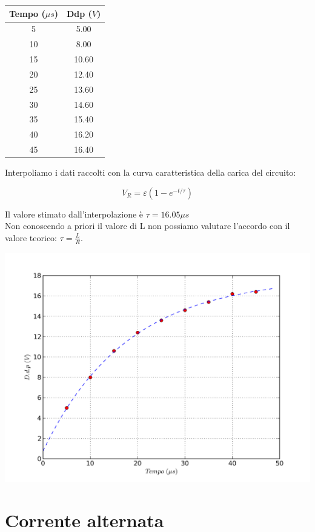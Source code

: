 \begin{center}
\begin{tabular}{*{2}{c}}
Tempo ($\mu s$) & Ddp ($V$) \\
\midrule
5 & 5.00 \\
10 & 8.00 \\
15 & 10.60 \\
20 & 12.40 \\
25 & 13.60 \\
30 & 14.60 \\
35 & 15.40 \\
40 & 16.20 \\
45 & 16.40 \\
\end{tabular}
\end{center}
Interpoliamo i dati raccolti con la curva caratteristica della carica del circuito:

$$V_R = \varepsilon \left( 1-e^{-t/\tau} \right)$$

Il valore stimato dall'interpolazione è $\tau=16.05 \mu s$ \\
Non conoscendo a priori il valore di L non possiamo valutare l'accordo con il valore teorico: $\tau=\frac{L}{R}$.

\begin{center}
 \includegraphics[scale=0.70]{grafici/C3/fitindu.png}
\end{center}




\section{Corrente alternata}
